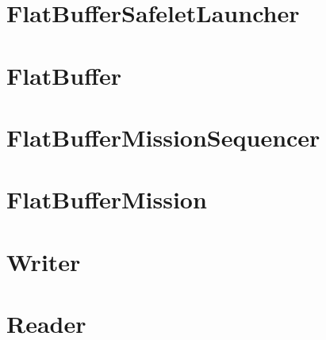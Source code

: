 \documentclass[10pt,a4paper,final]{article}
\begin{document}
\section{FlatBufferSafeletLauncher}

\pagebreak

\section{FlatBuffer}

\pagebreak

\section{FlatBufferMissionSequencer}

\pagebreak

\section{FlatBufferMission}

\pagebreak

\pagebreak

\section{Writer}

\pagebreak



\pagebreak

\section{Reader}

\pagebreak
\end{document}
